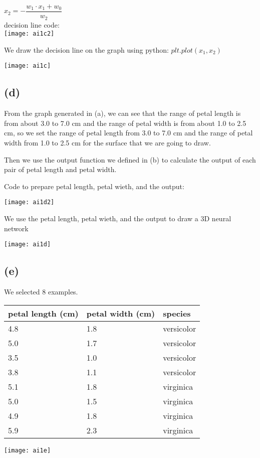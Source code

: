 \documentclass[11pt]{article}
\begin{document}
$x_2 = -\dfrac{w_1 \cdot x_1 + w_0}{w_2}$\\

decision line code:\\

\texttt{[image: ai1c2]}

We draw the decision line on the graph using python: $plt.plot(x_1, x_2)$

\texttt{[image: ai1c]}

\subsection*{(d)}

From the graph generated in (a), we can see that the range of petal length is from about 3.0 to 7.0 cm and the range of petal width is from about 1.0 to 2.5 cm,
so we set the range of petal length from 3.0 to 7.0 cm and the range of petal width from 1.0 to 2.5 cm for the surface that we are going to draw.

Then we use the output function we defined in (b) to calculate the output of each pair of petal length and petal width.

Code to prepare petal length, petal wieth, and the output:

\texttt{[image: ai1d2]}

We use the petal length, petal wieth, and the output to draw a 3D neural network

\texttt{[image: ai1d]}

\subsection*{(e)}

We selected 8 examples. 

\begin{tabular}{|l l l|}
    \hline
    petal length (cm) & petal width (cm) & species\\
    \hline
    4.8 & 1.8 & versicolor\\
    5.0 & 1.7 & versicolor\\
    3.5 & 1.0 & versicolor\\
    3.8 & 1.1 & versicolor\\
    5.1 & 1.8 & virginica \\
    5.0 & 1.5 & virginica \\
    4.9 & 1.8 & virginica \\
    5.9 & 2.3 & virginica \\
    \hline
\end{tabular}

\texttt{[image: ai1e]}
\end{document}
